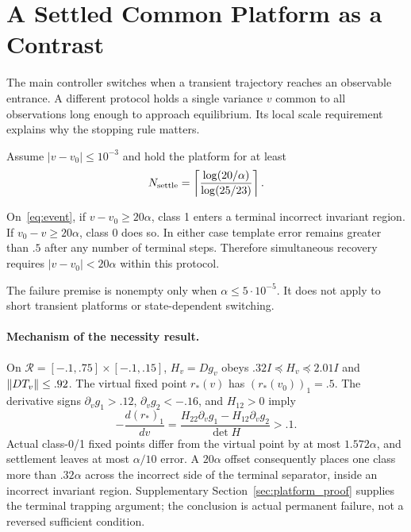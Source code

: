 \section{A Settled Common Platform as a Contrast}\label{sec:platform}
The main controller switches when a transient trajectory reaches an observable entrance. A different protocol holds a single variance $v$ common to all observations long enough to approach equilibrium. Its local scale requirement explains why the stopping rule matters.

Assume $|v-v_0|\le10^{-3}$ and hold the platform for at least
\begin{equation}
N_{\rm settle}=\left\lceil\frac{\log(20/\alpha)}{\log(25/23)}\right\rceil.
\end{equation}
\begin{proposition}\label{prop:calibration}
On~\eqref{eq:event}, if $v-v_0\ge20\alpha$, class 1 enters a terminal incorrect invariant region. If $v_0-v\ge20\alpha$, class 0 does so. In either case template error remains greater than $.5$ after any number of terminal steps. Therefore simultaneous recovery requires $|v-v_0|<20\alpha$ within this protocol.
\end{proposition}
The failure premise is nonempty only when $\alpha\le5\cdot10^{-5}$. It does not apply to short transient platforms or state-dependent switching.

\paragraph{Mechanism of the necessity result.}
On $\mathcal R=[-.1,.75]\times[-.1,.15]$, $H_v=Dg_v$ obeys $.32I\preceq H_v\preceq2.01I$ and $\lVert DT_v\rVert\le.92$. The virtual fixed point $r_*(v)$ has $(r_*(v_0))_1=.5$. The derivative signs $\partial_vg_1>.12$, $\partial_vg_2<-.16$, and $H_{12}>0$ imply
\begin{equation}
-\frac{d(r_*)_1}{dv}
=\frac{H_{22}\partial_vg_1-H_{12}\partial_vg_2}{\det H}>.1.
\end{equation}
Actual class-0/1 fixed points differ from the virtual point by at most $1.572\alpha$, and settlement leaves at most $\alpha/10$ error. A $20\alpha$ offset consequently places one class more than $.32\alpha$ across the incorrect side of the terminal separator, inside an incorrect invariant region. Supplementary Section~\ref{sec:platform_proof} supplies the terminal trapping argument; the conclusion is actual permanent failure, not a reversed sufficient condition.

